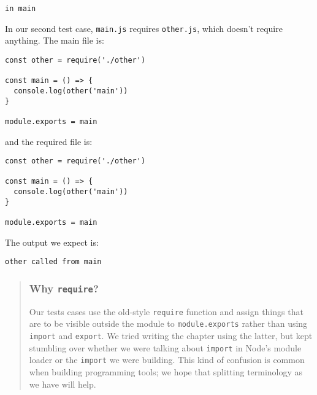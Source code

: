 \documentclass[krantzl]{krantz}
\newenvironment{callout}{\savenotes\begin{tBox}\begin{quotation}\toggletrue{inbox}\renewcommand{\thempfootnote}{\arabic{footnote}}}{\end{quotation}\vspace{\baselineskip}\end{tBox}\togglefalse{inbox}\spewnotes}
\begin{document}
\begin{lstlisting}[frame=single,frameround=tttt]
in main
\end{lstlisting}



In our second test case,
\texttt{main.js} requires \texttt{other.js},
which doesn't require anything.
The main file is:


\begin{lstlisting}[frame=single,frameround=tttt]
const other = require('./other')

const main = () => {
  console.log(other('main'))
}

module.exports = main
\end{lstlisting}



\noindent and the required file is:


\begin{lstlisting}[frame=single,frameround=tttt]
const other = require('./other')

const main = () => {
  console.log(other('main'))
}

module.exports = main
\end{lstlisting}



\noindent The output we expect is:


\begin{lstlisting}[frame=single,frameround=tttt]
other called from main
\end{lstlisting}


\begin{callout}


\subsubsection*{Why \texttt{require}?}


Our tests cases use the old-style \texttt{require} function
and assign things that are to be visible outside the module to \texttt{module.exports}
rather than using \texttt{import} and \texttt{export}.
We tried writing the chapter using the latter,
but kept stumbling over whether we were talking about \texttt{import} in Node's module loader
or the \texttt{import} we were building.
This kind of confusion is common when building programming tools;
we hope that splitting terminology as we have will help.

\end{callout}
\end{document}
